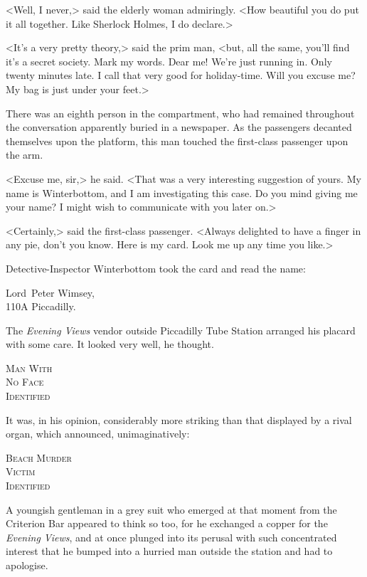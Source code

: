 <Well, I never,> said the elderly woman admiringly. <How beautiful you do put it all together. Like Sherlock Holmes, I do declare.>

<It's a very pretty theory,> said the prim man, <but, all the same, you'll find it's a secret society. Mark my words. Dear me! We're just running in. Only twenty minutes late. I call that very good for holiday-time. Will you excuse me? My bag is just under your feet.>

There was an eighth person in the compartment, who had remained throughout the conversation apparently buried in a newspaper. As the passengers decanted themselves upon the platform, this man touched the first-class passenger upon the arm.

<Excuse me, sir,> he said. <That was a very interesting suggestion of yours. My name is Winterbottom, and I am investigating this case. Do you mind giving me your name? I might wish to communicate with you later on.>

<Certainly,> said the first-class passenger. <Always delighted to have a finger in any pie, don't you know. Here is my card. Look me up any time you like.>

Detective-Inspector Winterbottom took the card and read the name:
\begin{center}
Lord~Peter Wimsey,\\
110A Piccadilly.
\end{center}

\divider

The \textit{Evening Views} vendor outside Piccadilly Tube Station arranged his placard with some care. It looked very well, he thought.

\begin{center}\scshape\Large
Man With\\
No Face\\
Identified
\end{center}

It was, in his opinion, considerably more striking than that displayed by a rival organ, which announced, unimaginatively:
\begin{center}\scshape\Large
Beach Murder\\
Victim\\
Identified
\end{center}

A youngish gentleman in a grey suit who emerged at that moment from the Criterion Bar appeared to think so too, for he exchanged a copper for the \textit{Evening Views}, and at once plunged into its perusal with such concentrated interest that he bumped into a hurried man outside the station and had to apologise.

